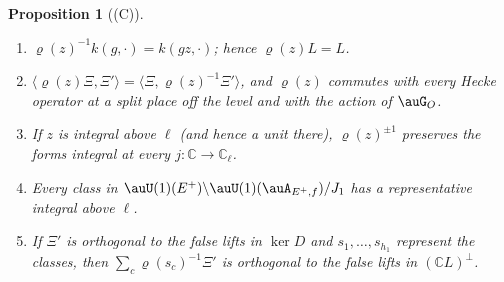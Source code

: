 \documentclass[10pt]{amsart}
\newtheorem{proposition}[theorem]{Proposition}
\theoremstyle{definition}
\theoremstyle{remark}
\newcommand{\C}{\mathbb C}
\begin{document}
\begin{proposition}[(C)]\label{pga:C}
\begin{enumerate}
\item[(a)] $\varrho(z)^{-1}k(g,\cdot)=k(gz,\cdot)$; hence $\varrho(z)L=L$.
\item[(b)] $\langle\varrho(z)\Xi,\Xi'\rangle=\langle\Xi,\varrho(z)^{-1}\Xi'\rangle$, and
$\varrho(z)$ commutes with every Hecke operator at a split place off the level and with the action
of $\auG_O$.
\item[(c)] If $z$ is integral above $\ell$ (and hence a unit there), $\varrho(z)^{\pm1}$ preserves
the forms integral at every $j\colon\C\to\C_\ell$.
\item[(d)] Every class in $\auU(1)(E^+)\backslash\auU(1)(\auA_{E^+,f})/J_1$ has a representative
integral above $\ell$.
\item[(e)] If $\Xi'$ is orthogonal to the false lifts in $\ker D$ and $s_1,\dots,s_{h_1}$ represent
the classes, then $\sum_c\varrho(s_c)^{-1}\Xi'$ is orthogonal to the false lifts in $(\C L)^\perp$.
\end{enumerate}
\end{proposition}
\end{document}
